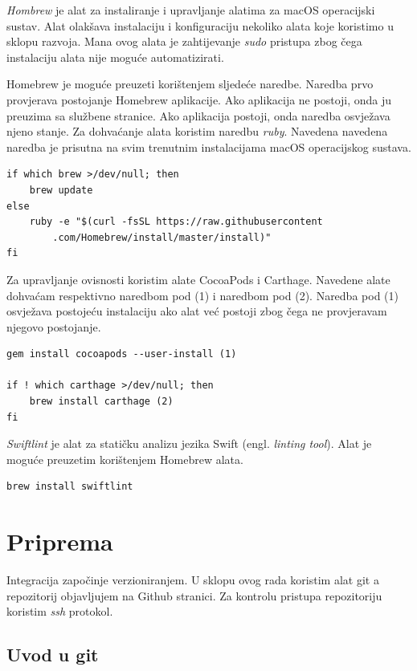 \documentclass[times, utf8, diplomski, numeric]{fer}
\newcommand{\eng}[1]{(engl. \textit{#1})}
\begin{document}
\begin{appendices}
\textit{Hombrew} je alat za instaliranje i upravljanje alatima za macOS operacijski sustav. Alat olakšava instalaciju i konfiguraciju nekoliko alata koje koristimo u sklopu razvoja. Mana ovog alata je zahtijevanje \textit{sudo} pristupa zbog čega instalaciju alata nije moguće automatizirati.

Homebrew je moguće preuzeti korištenjem sljedeće naredbe. Naredba prvo provjerava postojanje Homebrew aplikacije. Ako aplikacija ne postoji, onda ju preuzima sa službene stranice. Ako aplikacija postoji, onda naredba osvježava njeno stanje. Za dohvaćanje alata koristim naredbu \textit{ruby}. Navedena navedena naredba je prisutna na svim trenutnim instalacijama macOS operacijskog sustava.

\begin{verbatim}
if which brew >/dev/null; then
    brew update
else
    ruby -e "$(curl -fsSL https://raw.githubusercontent
        .com/Homebrew/install/master/install)"
fi
\end{verbatim}

Za upravljanje ovisnosti koristim alate CocoaPods i Carthage. Navedene alate dohvaćam respektivno naredbom pod (1) i naredbom pod (2). Naredba pod (1) osvježava postojeću instalaciju ako alat već postoji zbog čega ne provjeravam njegovo postojanje.

\begin{verbatim}
gem install cocoapods --user-install (1)

if ! which carthage >/dev/null; then
    brew install carthage (2)
fi
\end{verbatim}

\textit{Swiftlint} je alat za statičku analizu jezika Swift \eng{linting tool}. Alat je moguće preuzetim korištenjem Homebrew alata.

\begin{verbatim}
brew install swiftlint
\end{verbatim}


\section{Priprema} \label{IntegracijaDodatakA}

Integracija započinje verzioniranjem. U sklopu ovog rada koristim alat git a repozitorij objavljujem na Github stranici. Za kontrolu pristupa repozitoriju koristim \textit{ssh} protokol.

\subsection{Uvod u git} \label{uvodUGit}


\end{appendices}
\end{document}
